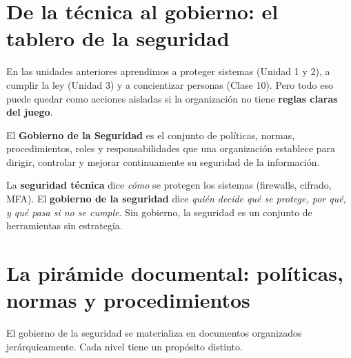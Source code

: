 \documentclass[12pt,a4paper]{article}
\begin{document}
\tableofcontents
\newpage

\section{De la t\'ecnica al gobierno: el tablero de la seguridad}

En las unidades anteriores aprendimos a proteger sistemas (Unidad 1 y 2), a cumplir la ley (Unidad 3) y a concientizar personas (Clase 10). Pero todo eso puede quedar como acciones aisladas si la organizaci\'on no tiene \textbf{reglas claras del juego}.

\begin{cajaDefinicion}
El \textbf{Gobierno de la Seguridad} es el conjunto de pol\'iticas, normas, procedimientos, roles y responsabilidades que una organizaci\'on establece para dirigir, controlar y mejorar continuamente su seguridad de la informaci\'on.
\end{cajaDefinicion}

\begin{cajaNota}[title={La diferencia fundamental}]
La \textbf{seguridad t\'ecnica} dice \emph{c\'omo} se protegen los sistemas (firewalls, cifrado, MFA). El \textbf{gobierno de la seguridad} dice \emph{qui\'en decide qu\'e se protege, por qu\'e, y qu\'e pasa si no se cumple}. Sin gobierno, la seguridad es un conjunto de herramientas sin estrategia.
\end{cajaNota}

\newpage
\section{La pir\'amide documental: pol\'iticas, normas y procedimientos}

El gobierno de la seguridad se materializa en documentos organizados jer\'arquicamente. Cada nivel tiene un prop\'osito distinto.
\end{document}
